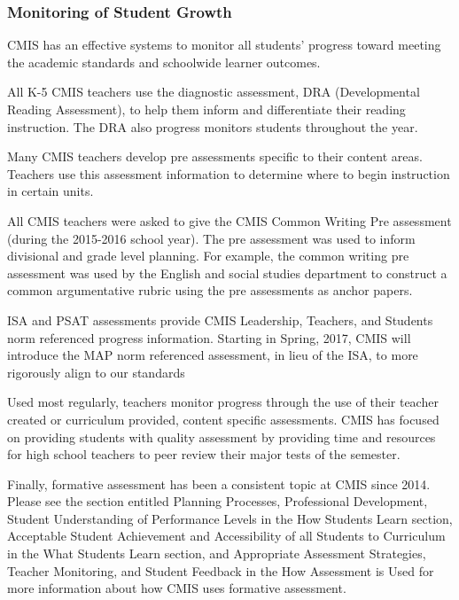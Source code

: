\subsubsection{Monitoring of Student Growth}



\begin{findings}
CMIS has an effective systems to monitor all students’ progress toward meeting the academic standards and schoolwide learner outcomes.

 
All K-5 CMIS teachers use the diagnostic assessment, DRA (Developmental Reading Assessment), to help them inform and differentiate their reading instruction. The DRA also progress monitors students throughout the year. 

Many CMIS teachers develop pre assessments specific to their content areas. Teachers use this assessment information to determine where to begin instruction in certain units. 

All CMIS teachers were asked to give the CMIS Common Writing Pre assessment (during the 2015-2016 school year). The pre assessment was used to inform divisional and grade level planning. For example, the common writing pre assessment was used by the English and social studies department to construct a common argumentative rubric using the pre assessments as anchor papers.

ISA and PSAT assessments provide CMIS Leadership, Teachers, and Students norm referenced progress information. Starting in Spring, 2017, CMIS will introduce the MAP norm referenced assessment, in lieu of the ISA, to more rigorously align to our standards 

Used most regularly, teachers monitor progress through the use of their teacher created or curriculum provided, content specific assessments. CMIS has focused on providing students with quality assessment by providing time and resources for high school teachers to peer review their major tests of the semester. 

Finally, formative assessment has been a consistent topic at CMIS since 2014. Please see the section entitled Planning Processes, Professional Development, Student Understanding of Performance Levels in the How Students Learn section, Acceptable Student Achievement and Accessibility of all Students to Curriculum in the What Students Learn section, and Appropriate Assessment Strategies, Teacher Monitoring, and Student Feedback in the How Assessment is Used for more information about how CMIS uses formative assessment. 


\end{findings}
